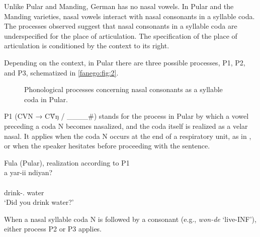 \documentclass[output=paper]{langscibook}
\begin{document}
Unlike Pular and Manding, German has no nasal vowels. In Pular and the Manding varieties, nasal vowels interact with nasal consonants in a syllable coda. The processes observed suggest that nasal consonants in a syllable coda are underspecified for the place of articulation. The specification of the place of articulation is conditioned by the context to its right.

Depending on the context, in Pular there are three possible processes, P1, P2, and P3, schematized in \autoref{fanego:fig:2}.


\begin{figure}

    \caption{Phonological processes concerning nasal consonants as a syllable coda in Pular.}
    \label{fanego:fig:2}
\end{figure}


P1 (CVN → CṼŋ / \_\_\_\_\#) stands for the process in Pular by which a vowel preceding a coda N becomes nasalized, and the coda itself is realized as a velar nasal. It applies when the coda N occurs at the end of a respiratory unit, as in , or when the speaker hesitates before proceeding with the sentence.

\begin{exe}
    \ex\label{fanego:ex:23} Fula (Pular), realization according to P1 \\
    \glll a yar-ii ndiyan? \\
    [ʔa jar-iː ndijãŋ] \\
    \Second\SG{} drink-\PFV.\ABS{} water \\
    \glt ‘Did you drink water?’
\end{exe}

\noindent
When a nasal syllable coda N is followed by a consonant (e.g., \textit{won-de} ‘live-INF’), either process P2 or P3 applies.
\end{document}
